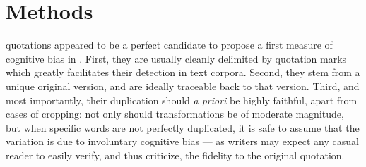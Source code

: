 \section{Methods} %
\label{sec:protocol}


 quotations appeared to be a perfect candidate to propose a first measure of  cognitive bias in .
First, they are usually cleanly delimited by quotation marks which greatly facilitates their detection in text corpora.
Second, they stem from a unique original version, and are ideally traceable back to that version.
Third, and most importantly, their duplication should \emph{a priori} be highly faithful, apart from cases of cropping:
not only should transformations be of moderate magnitude, but when specific words are not perfectly duplicated, it is safe to assume that the variation is due to involuntary cognitive bias --- as writers may expect any casual reader to easily verify, and thus criticize, the fidelity to the original quotation.

